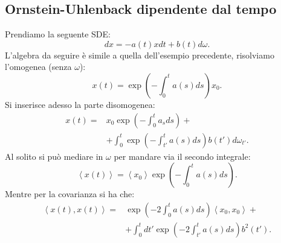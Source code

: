 \subsection{Ornstein-Uhlenback dipendente dal tempo}%
\label{sub:Ornstein-Uhlenback dipendente dal tempo}
Prendiamo la seguente SDE:
\[
    dx = -a(t) x dt + b(t) d\omega
.\] 
L'algebra da seguire è simile a quella dell'esempio precedente, risolviamo l'omogenea (senza $\omega$):
\[
    x(t) = \exp\left(-\int_{0}^{t} a(s) ds \right)x_0
.\] 
Si inserisce adesso la parte disomogenea:
\[\begin{aligned}
    x(t) =& x_0 \exp\left(-\int_{0}^{t} a_sds \right) + \\
	  & + \int_{0}^{t} \exp\left(-\int_{t'}^{t} a(s) ds  \right)b(t') d\omega_{t'} 
.\end{aligned}\]
Al solito si può mediare in $\omega$ per mandare via il secondo integrale:
\[
    \left<x(t)\right> = \left<x_0\right> \exp\left(-\int_{0}^{t} a(s) ds \right)
.\] 
Mentre per la covarianza si ha che:
\[\begin{aligned}
    \left<x(t),x(t) \right> = & \exp\left(-2  \int_{0}^{t} a(s) ds \right)\left<x_0,x_0\right> + \\
			      & + \int_{0}^{t} dt'  \exp\left(-2\int_{t'}^{t} a(s) ds \right) b^2(t') 
.\end{aligned}\]
\clearpage
